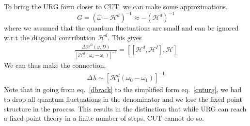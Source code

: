 \documentclass[twoside]{report}
\numberwithin{equation}{section}
\begin{document}
\\\\To bring the URG form closer to CUT, we can make some approximations. 
\begin{equation}
G = \left(\hat \omega - \mathcal{H}^d\right)^{-1} \approx -\left(\mathcal{H}^d\right)^{-1}
\end{equation}
where we assumed that the quantum fluctuations are small and can be ignored w.r.t the diagonal contribution \(\mathcal{H}^d\). This gives
\begin{equation}\begin{aligned}
	\label{cuturg}
	\frac{\Delta \mathcal{H}^0(\omega,D)}{\left[\mathcal{H}^d_1\left(\omega_0 - \omega_1\right)\right]^{-1}} =  \left[\left[\mathcal{H}^d,\mathcal{H}^I\right],\mathcal{H}\right]
\end{aligned}\end{equation}
We can thus make the connection,
\begin{equation}\begin{aligned}
\Delta \lambda \sim \left[\mathcal{H}^d_1\left(\omega_0 - \omega_1\right)\right]^{-1}
\end{aligned}\end{equation}
Note that in going from eq.~\ref{dbrack} to the simplified form eq.~\ref{cuturg}, we had to drop all quantum fluctuations in the denominator and we lose the fixed point structure in the process. This results in the distinction that while URG can reach a fixed point theory in a finite number of steps, CUT cannot do so.
\end{document}
